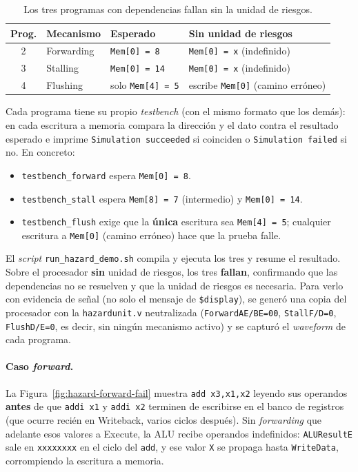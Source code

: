 \documentclass[11pt,a4paper]{article}
\begin{document}
\begin{table}[ht]
	\centering
	\begin{tabular}{@{}clll@{}}
		\toprule
		\textbf{Prog.} & \textbf{Mecanismo} & \textbf{Esperado}        & \textbf{Sin unidad de riesgos}           \\
		\midrule
		2              & Forwarding         & \texttt{Mem[0] = 8}      & \texttt{Mem[0] = x} (indefinido)         \\
		3              & Stalling           & \texttt{Mem[0] = 14}     & \texttt{Mem[0] = x} (indefinido)         \\
		4              & Flushing           & solo \texttt{Mem[4] = 5} & escribe \texttt{Mem[0]} (camino erróneo) \\
		\bottomrule
	\end{tabular}
	\caption{Los tres programas con dependencias fallan sin la unidad de riesgos.}
	\label{cuadro:sinhu}
\end{table}

Cada programa tiene su propio \textit{testbench} (con el mismo formato que los demás):
en cada escritura a memoria compara la dirección y el dato contra el resultado esperado
e imprime \texttt{Simulation succeeded} si coinciden o \texttt{Simulation failed} si no.
En concreto:

\begin{itemize}
	\item \texttt{testbench\_forward} espera \texttt{Mem[0] = 8}.
	\item \texttt{testbench\_stall} espera \texttt{Mem[8] = 7} (intermedio) y
	      \texttt{Mem[0] = 14}.
	\item \texttt{testbench\_flush} exige que la \textbf{única} escritura sea
	      \texttt{Mem[4] = 5}; cualquier escritura a \texttt{Mem[0]} (camino erróneo)
	      hace que la prueba falle.
\end{itemize}

El \textit{script} \texttt{run\_hazard\_demo.sh} compila y ejecuta los tres y resume el
resultado. Sobre el procesador \textbf{sin} unidad de riesgos, los tres
\textbf{fallan}, confirmando que las dependencias no se resuelven y que la unidad
de riesgos es necesaria. Para verlo con evidencia de señal (no solo el mensaje de
\texttt{\$display}), se generó una copia del procesador con la
\texttt{hazardunit.v} neutralizada (\texttt{ForwardAE/BE=00}, \texttt{StallF/D=0},
\texttt{FlushD/E=0}, es decir, sin ningún mecanismo activo) y se capturó el
\textit{waveform} de cada programa.

\paragraph{Caso \textit{forward}.} La Figura~\ref{fig:hazard-forward-fail} muestra
\texttt{add x3,x1,x2} leyendo sus operandos \textbf{antes} de que \texttt{addi x1}
y \texttt{addi x2} terminen de escribirse en el banco de registros (que ocurre
recién en Writeback, varios ciclos después). Sin \textit{forwarding} que adelante
esos valores a Execute, la ALU recibe operandos indefinidos: \texttt{ALUResultE}
sale en \texttt{xxxxxxxx} en el ciclo del \texttt{add}, y ese valor \texttt{X} se
propaga hasta \texttt{WriteData}, corrompiendo la escritura a memoria.
\end{document}
